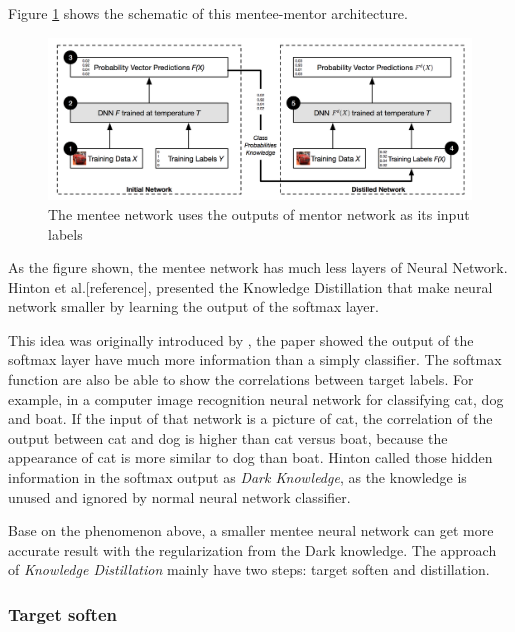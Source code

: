 \documentclass[article]{aaltoseries}
\begin{document}
Figure \ref{fig:mentor_pic}\cite{Distillation:2015} shows the schematic of this mentee-mentor architecture. 

\begin{figure}[t!]
  \begin{center}
    \includegraphics[width=1\textwidth]{figures/mentor_mentee}
    \caption{The mentee network uses the outputs of mentor network as its input labels}
    \label{fig:mentor_pic}
  \end{center}
\end{figure}

As the figure shown, the mentee network has much less layers of Neural Network. 
Hinton et al.[reference], presented the Knowledge Distillation that make neural network smaller by learning the 
output of the softmax layer\cite{SoftMax}. 

This idea was originally introduced by \cite{Caruana2006}, the paper showed 
the output of the softmax layer have much more information than a simply classifier. 
The softmax function are also be able to show the correlations between
target labels. For example, in a computer image recognition neural network for classifying cat, dog and boat.
If the input of that network is a picture of cat, the correlation of the output
between cat and dog is higher than cat versus boat, because the appearance of cat is more similar to dog than boat.
Hinton called those hidden information in the softmax output as \emph{Dark Knowledge}, 
as the knowledge is unused and ignored by normal neural network classifier.

Base on the phenomenon above, a smaller mentee neural network can get more accurate result with the regularization from
the Dark knowledge. 
The approach of \emph{Knowledge Distillation} mainly have two steps: target soften and distillation.

\subsubsection{Target soften}
\end{document}
